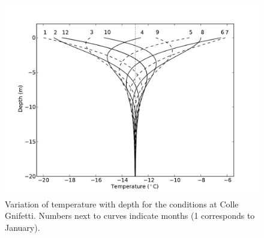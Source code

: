 \documentclass[11pt,a4paper,halfparskip]{scrartcl}
\begin{document}
\begin{figure}[htbp]
 \centering
 \includegraphics[height=10.cm]{figures/temp-variation}  
 \caption{Variation of temperature with depth for the conditions at Colle
   Gnifetti.  Numbers next to curves indicate months (1 corresponds to January). }
 \label{fig:water}
\end{figure}
\end{document}
